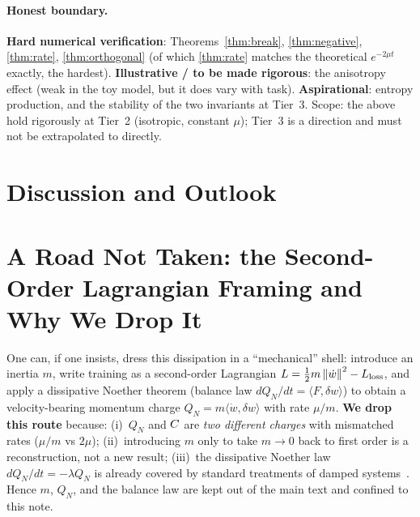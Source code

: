 \documentclass[11pt]{article}
\begin{document}
\paragraph{Honest boundary.}
\textbf{Hard numerical verification}: Theorems~\ref{thm:break}, \ref{thm:negative}, \ref{thm:rate},
\ref{thm:orthogonal} (of which \ref{thm:rate} matches the theoretical $e^{-2\mu t}$ exactly, the
hardest). \textbf{Illustrative / to be made rigorous}: the anisotropy effect (weak in the toy model,
but it does vary with task). \textbf{Aspirational}: entropy production, and the stability of the two
invariants at Tier~3. Scope: the above hold rigorously at Tier~2 (isotropic, constant $\mu$); Tier~3
is a direction and must not be extrapolated to directly.

\section{Discussion and Outlook}\label{sec:outlook}

\appendix
\section{A Road Not Taken: the Second-Order Lagrangian Framing and Why We Drop It}\label{app:roadnottaken}
One can, if one insists, dress this dissipation in a ``mechanical'' shell: introduce an inertia $m$,
write training as a second-order Lagrangian $L=\tfrac12 m\left\lVert \dot w \right\rVert^2 - L_{\text{loss}}$, and
apply a dissipative Noether theorem (balance law $dQ_N/dt=\langle F,\delta w\rangle$) to obtain a
velocity-bearing momentum charge $Q_N=m\langle\dot w,\delta w\rangle$ with rate $\mu/m$.
\textbf{We drop this route} because: (i)~$Q_N$ and $C$ are \emph{two different charges} with
mismatched rates ($\mu/m$ vs $2\mu$); (ii)~introducing $m$ only to take $m\to0$ back to first order
is a reconstruction, not a new result; (iii)~the dissipative Noether law $dQ_N/dt=-\lambda Q_N$ is
already covered by standard treatments of damped systems~\citep{galley2013classical}. Hence $m$,
$Q_N$, and the balance law are kept out of the main text and confined to this note.



\end{document}

